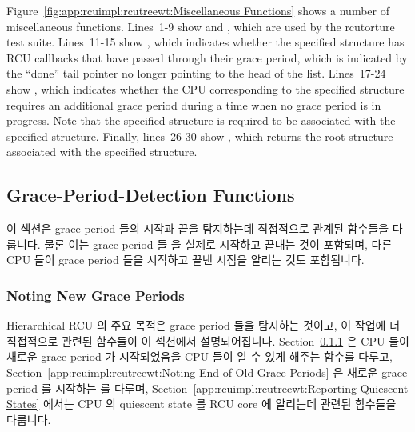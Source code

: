 Figure~\ref{fig:app:rcuimpl:rcutreewt:Miscellaneous Functions}
shows a number of miscellaneous functions.
Lines~1-9 show  and
, which are used by the rcutorture
test suite.
Lines~11-15 show , which
indicates whether the specified  structure has RCU
callbacks that have passed through their grace period, which
is indicated by the ``done'' tail pointer no longer pointing
to the head of the list.
Lines~17-24 show , which indicates
whether the CPU corresponding to the specified 
structure requires an additional grace period during a time when
no grace period is in progress.
Note that the specified  structure is required
to be associated with the specified  structure.
Finally, lines~26-30 show , which returns
the root  structure associated with the specified
 structure.
\fi

\subsection{Grace-Period-Detection Functions}
\label{app:rcuimpl:rcutreewt:Grace-Period-Detection Functions}

이 섹션은 grace period 들의 시작과 끝을 탐지하는데 직접적으로 관계된 함수들을
다룹니다.
물론 이는 grace period 들 을 실제로 시작하고 끝내는 것이 포함되며, 다른 CPU
들이 grace period 들을 시작하고 끝낸 시점을 알리는 것도 포함됩니다.
\iffalse

This section covers functions that are directly involved in detecting
beginnings and ends of grace periods.
This of course includes actually starting and ending grace periods,
but also includes noting when other CPUs have started or ended
grace periods.
\fi

\subsubsection{Noting New Grace Periods}
\label{app:rcuimpl:rcutreewt:Noting New Grace Periods}

Hierarchical RCU 의 주요 목적은 grace period 들을 탐지하는 것이고, 이 작업에 더
직접적으로 관련된 함수들이 이 섹션에서 설명되어집니다.
Section~\ref{app:rcuimpl:rcutreewt:Noting New Grace Periods}
은 CPU 들이 새로운 grace period 가 시작되었음을 CPU 들이 알 수 있게 해주는
함수를 다루고,
Section~\ref{app:rcuimpl:rcutreewt:Noting End of Old Grace Periods}
은 새로운 grace period 를 시작하는  를 다루며,
Section~\ref{app:rcuimpl:rcutreewt:Reporting Quiescent States}
에서는 CPU 의 quiescent state 를 RCU core 에 알리는데 관련된 함수들을 다룹니다.
\iffalse

